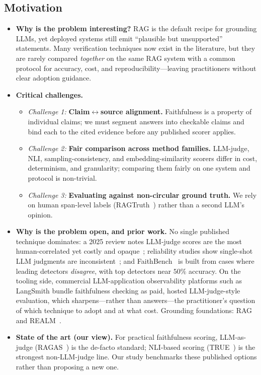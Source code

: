 \subsection{Motivation}
\begin{itemize}
    \item \textbf{Why is the problem interesting?}
    RAG is the default recipe for grounding LLMs, yet deployed systems still emit
    ``plausible but unsupported'' statements. Many verification techniques now exist in the
    literature, but they are rarely compared \emph{together} on the same RAG system with a
    common protocol for accuracy, cost, and reproducibility---leaving practitioners without
    clear adoption guidance.

    \item \textbf{Critical challenges.}
    \begin{itemize}
      \item \emph{Challenge 1:} \textbf{Claim$\leftrightarrow$source alignment.}
      Faithfulness is a property of individual claims; we must segment answers into
      checkable claims and bind each to the cited evidence before any published scorer
      applies.
      \item \emph{Challenge 2:} \textbf{Fair comparison across method families.}
      LLM-judge, NLI, sampling-consistency, and embedding-similarity scorers differ in
      cost, determinism, and granularity; comparing them fairly on one system and protocol
      is non-trivial.
      \item \emph{Challenge 3:} \textbf{Evaluating against non-circular ground truth.}
      We rely on human span-level labels (RAGTruth~\citep{niu2024ragtruth}) rather than a
      second LLM's opinion.
    \end{itemize}

    \item \textbf{Why is the problem open, and prior work.}
    No single published technique dominates: a 2025 review notes LLM-judge scores are the
    most human-correlated yet costly and opaque~\citep{malin2025faithfulnessreview};
    reliability studies show single-shot LLM judgments are
    inconsistent~\citep{schroeder2024trustjudge, yamauchi2026empiricaljudge}; and
    FaithBench~\citep{bao2025faithbench} is built from cases where leading detectors
    \emph{disagree}, with top detectors near $50\%$ accuracy. On the tooling side,
    commercial LLM-application observability platforms such as LangSmith bundle faithfulness
    checking as paid, hosted LLM-judge-style evaluation, which sharpens---rather than
    answers---the practitioner's question of which technique to adopt and at what cost.
    Grounding foundations: RAG~\citep{lewis2020rag} and REALM~\citep{guu2020realm}.

    \item \textbf{State of the art (our view).} For practical faithfulness scoring,
    LLM-as-judge (RAGAS~\citep{es2024ragas}) is the de-facto standard; NLI-based scoring
    (TRUE~\citep{honovich2022true}) is the strongest non-LLM-judge line. Our study
    benchmarks these published options rather than proposing a new one.
\end{itemize}
